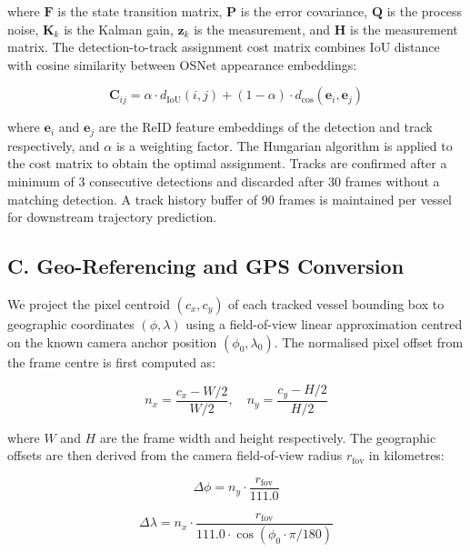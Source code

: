 \documentclass{ieeeaccess}
\begin{document}
where $\mathbf{F}$ is the state transition matrix, $\mathbf{P}$ is 
the error covariance, $\mathbf{Q}$ is the process noise, $\mathbf{K}_k$ 
is the Kalman gain, $\mathbf{z}_k$ is the measurement, and $\mathbf{H}$ 
is the measurement matrix. The detection-to-track assignment cost matrix 
combines IoU distance with cosine similarity between OSNet appearance 
embeddings:

\begin{equation}
\mathbf{C}_{ij} = \alpha \cdot d_{\text{IoU}}(i,j) + 
(1-\alpha) \cdot d_{\text{cos}}(\mathbf{e}_i, \mathbf{e}_j)
\end{equation}

where $\mathbf{e}_i$ and $\mathbf{e}_j$ are the ReID feature embeddings 
of the detection and track respectively, and $\alpha$ is a weighting 
factor. The Hungarian algorithm is applied to the cost matrix to obtain 
the optimal assignment. Tracks are confirmed after a minimum of 3 
consecutive detections and discarded after 30 frames without a matching 
detection. A track history buffer of 90 frames is maintained per vessel 
for downstream trajectory prediction.

\subsection*{C. Geo-Referencing and GPS Conversion}

We project the pixel centroid $(c_x, c_y)$ of each tracked vessel bounding box 
to geographic coordinates $(\phi, \lambda)$ using a 
field-of-view linear approximation centred on the known camera anchor 
position $(\phi_0, \lambda_0)$. The normalised pixel offset from the 
frame centre is first computed as:

\begin{equation}
n_x = \frac{c_x - W/2}{W/2}, \quad n_y = \frac{c_y - H/2}{H/2}
\end{equation}

where $W$ and $H$ are the frame width and height respectively. The 
geographic offsets are then derived from the camera field-of-view 
radius $r_{\text{fov}}$ in kilometres:

\begin{equation}
\Delta\phi = n_y \cdot \frac{r_{\text{fov}}}{111.0}
\end{equation}

\begin{equation}
\Delta\lambda = n_x \cdot \frac{r_{\text{fov}}}{111.0 \cdot 
\cos(\phi_0 \cdot \pi / 180)}
\end{equation}
\end{document}
